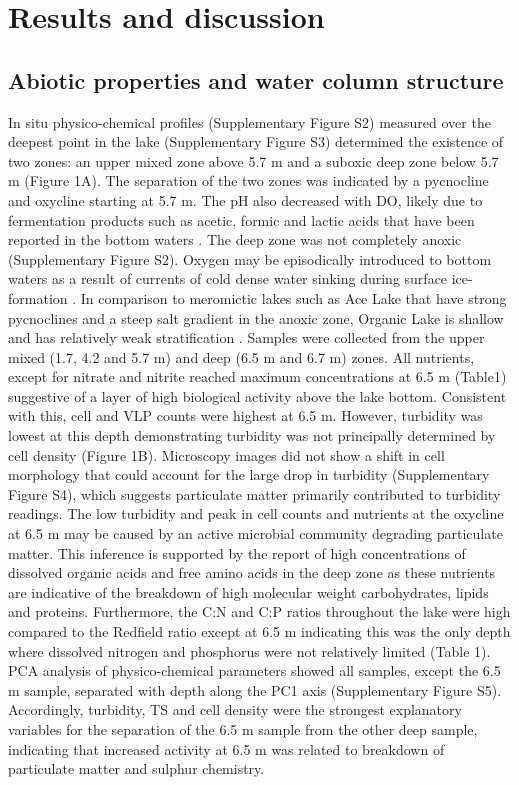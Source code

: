

\section{Results and discussion}

\subsection{Abiotic properties and water column structure}
In situ physico-chemical profiles (Supplementary Figure S2) measured over the deepest point in the lake (Supplementary Figure S3) determined the existence of two zones: an upper mixed zone above 5.7 m and a suboxic deep zone below 5.7 m (Figure 1A). 
The separation of the two zones was indicated by a pycnocline and oxycline starting at 5.7 m. 
The pH also decreased with \ac{DO}, likely due to fermentation products such as acetic, formic and lactic acids that have been reported in the bottom waters \cite{Franzmann1987b, Gibson1994}. 
The deep zone was not completely anoxic (Supplementary Figure S2). 
Oxygen may be episodically introduced to bottom waters as a result of currents of cold dense water sinking during surface ice-formation \cite{Ferris1999}. 
In comparison to meromictic lakes such as Ace Lake that have strong pycnoclines and a steep salt gradient in the anoxic zone, Organic Lake is shallow and has relatively weak stratification \cite{Gibson1999}. 
Samples were collected from the upper mixed (1.7, 4.2 and 5.7 m) and deep (6.5 m and 6.7 m) zones. 
All nutrients, except for nitrate and nitrite reached maximum concentrations at 6.5 m (Table1) suggestive of a layer of high biological activity above the lake bottom. 
Consistent with this, cell and \ac{VLP} counts were highest at 6.5 m. 
However, turbidity was lowest at this depth demonstrating turbidity was not principally determined by cell density (Figure 1B). 
Microscopy images did not show a shift in cell morphology that could account for the large drop in turbidity (Supplementary Figure S4), which suggests particulate matter primarily contributed to turbidity readings. 
The low turbidity and peak in cell counts and nutrients at the oxycline at 6.5 m may be caused by an active microbial community degrading particulate matter. 
This inference is supported by the report of high concentrations of dissolved organic acids and free amino acids in the deep zone \cite{Gibson1994} as these nutrients are indicative of the breakdown of high molecular weight carbohydrates, lipids and proteins. 
Furthermore, the C:N and C:P ratios throughout the lake were high compared to the Redfield ratio \cite{Redfield1963} except at 6.5 m indicating this was the only depth where dissolved nitrogen and phosphorus were not relatively limited (Table 1). 
\ac{PCA} analysis of physico-chemical parameters showed all samples, except the 6.5 m sample, separated with depth along the PC1 axis (Supplementary Figure S5). 
Accordingly, turbidity, \ac{TS} and cell density were the strongest explanatory variables for the separation of the 6.5 m sample from the other deep sample, indicating that increased activity at 6.5 m was related to breakdown of particulate matter and sulphur chemistry.

